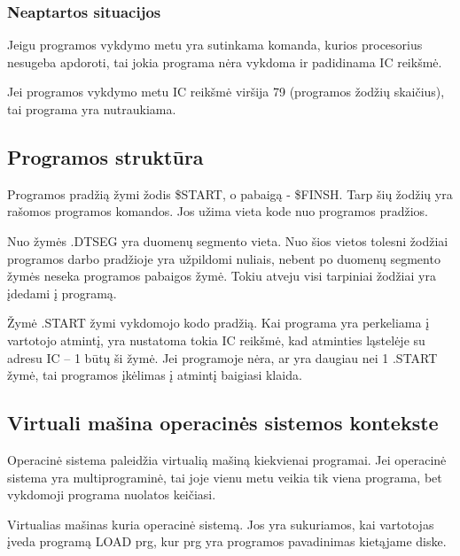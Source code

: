 \documentclass{VUMIFInfKursinis}
\begin{document}
\subsubsection{Neaptartos situacijos}

Jeigu programos vykdymo metu yra sutinkama komanda, kurios procesorius nesugeba apdoroti, tai jokia programa nėra vykdoma ir padidinama IC reikšmė.

Jei programos vykdymo metu IC reikšmė viršija 79 (programos žodžių skaičius), tai programa yra nutraukiama.

\subsection{Programos struktūra}

Programos pradžią žymi žodis \$START, o pabaigą - \$FINSH. Tarp šių žodžių yra rašomos programos komandos. Jos užima vieta kode nuo programos pradžios. 

Nuo žymės .DTSEG yra duomenų segmento vieta. Nuo šios vietos tolesni žodžiai programos darbo pradžioje yra užpildomi nuliais, nebent po duomenų segmento žymės neseka programos pabaigos žymė. Tokiu atveju visi tarpiniai žodžiai yra įdedami į programą.

Žymė .START žymi vykdomojo kodo pradžią. Kai programa yra perkeliama į vartotojo atmintį, yra nustatoma tokia IC reikšmė, kad  atminties ląstelėje su adresu IC – 1 būtų ši žymė. Jei programoje nėra, ar yra daugiau nei 1 .START žymė, tai programos įkėlimas į atmintį baigiasi klaida.

\subsection{Virtuali mašina operacinės sistemos kontekste}

Operacinė sistema paleidžia virtualią mašiną kiekvienai programai. Jei operacinė sistema yra multiprograminė, tai joje vienu metu veikia tik viena programa, bet vykdomoji programa nuolatos keičiasi.

Virtualias mašinas kuria operacinė sistemą. Jos yra sukuriamos, kai vartotojas įveda programą LOAD prg, kur prg yra programos pavadinimas kietąjame diske.

\printbibliography[heading=bibintoc] %
\appendix  %
\end{document}
